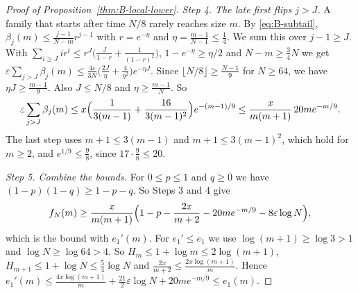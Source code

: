 \begin{proof}[Proof of Proposition~\ref{thm:B-local-lower}]
\emph{Step 4. The late first flips $j>J$.} A family that starts after time
$N/8$ rarely reaches size $m$. By \eqref{eq:B-subtail},
$\beta_j(m)\le\frac{j-1}{N-m}r^{j-1}$ with $r=e^{-\eta}$ and
$\eta=\frac{m-1}{N-1}\le\frac14$. We sum this over $j-1\ge J$. With
$\sum_{i\ge J}ir^i\le r^J\bigl(\frac J{1-r}+\frac1{(1-r)^2}\bigr)$, $1-e^{-\eta}\ge \eta/2$ and
$N-m\ge\frac34N$ we get
$\varepsilon\sum_{j>J}\beta_j(m)\le\frac{4\varepsilon}{3N}\bigl(\frac{2J}\eta+\frac4{\eta^2}\bigr)e^{-\eta J}$.
Since $\lfloor N/8\rfloor\ge\frac{N-1}9$ for $N\ge64$, we have $\eta J\ge\frac{m-1}9$. Also
$J\le N/8$ and $\eta\ge\frac{m-1}N$. So
\[
 \varepsilon\sum_{j>J}\beta_j(m)\le x\Bigl(\frac1{3(m-1)}+\frac{16}{3(m-1)^2}\Bigr)e^{-(m-1)/9}
 \le\frac{x}{m(m+1)}\,20me^{-m/9}.
\]
The last step uses $m+1\le3(m-1)$ and $m+1\le3(m-1)^2$, which hold for $m\ge2$, and
$e^{1/9}\le\frac98$, since $17\cdot\frac98\le20$.

\emph{Step 5. Combine the bounds.} For $0\le p\le1$ and $q\ge0$ we have
$(1-p)(1-q)\ge1-p-q$. So Steps 3 and 4 give
\[
 f_N(m)\ge\frac{x}{m(m+1)}\Bigl(1-p-\frac{2x}{m+2}-20me^{-m/9}-8\varepsilon\log N\Bigr),
\]
which is the bound with $e_1'(m)$. For $e_1'\le e_1$ we use $\log(m+1)\ge\log3>1$ and
$\log N\ge\log64>4$. So $H_m\le1+\log m\le2\log(m+1)$, $H_{m+1}\le1+\log N\le\frac54\log N$ and
$\frac{2x}{m+2}\le\frac{2x\log(m+1)}m$. Hence
$e_1'(m)\le\frac{4x\log(m+1)}m+\frac{21}2\varepsilon\log N+20me^{-m/9}\le e_1(m)$.
\end{proof}

